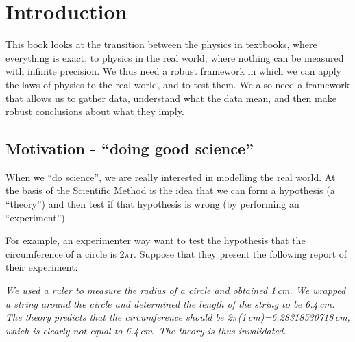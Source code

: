 %
\chapter{Introduction}
\label{chap:Intro}

This book looks at the transition between the physics in textbooks, where everything is exact, to physics in the real world, where nothing can be measured with infinite precision. We thus need a robust framework in which we can apply the laws of physics to the real world, and to test them. We also need a framework that allows us to gather data, understand what the data mean, and then make robust conclusions about what they imply. 

\section{Motivation - ``doing good science''}
When we ``do science'', we are really interested in modelling the real world. At the basis of the Scientific Method is the idea that we can form a hypothesis (a ``theory'') and then test if that hypothesis is wrong (by performing an ``experiment''). 

For example, an experimenter way want to test the hypothesis that the circumference of a circle is 2$\pi$r. Suppose that they present the following report of their experiment:

\textit{We used a ruler to measure the radius of a circle and obtained 1\,cm. We wrapped a string around the circle and determined the length of the string to be 6.4\,cm. The theory predicts that the circumference should be 2$\pi$(1\,cm)=6.28318530718\,cm, which is clearly not equal to 6.4\,cm. The theory is thus invalidated.}

